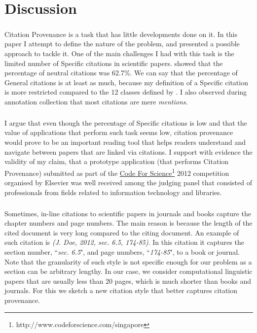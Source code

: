 \chapter{Discussion}
\label{discussion}
\paragraph{}
Citation Provenance is a task that has little developments done on it. In this paper I attempt to define the nature of the problem, and presented a possible approach to tackle it. One of the main challenges I had with this task is the limited number of Specific citations in scientific papers.  showed that the percentage of neutral citations was 62.7\%. We can say that the percentage of General citations is at least as much, because my definition of a Specific citation is more restricted compared to the 12 classes defined by . I also observed during annotation collection that most citations are mere {\it mentions}.

\paragraph{}
I argue that even though the percentage of Specific citations is low and that the value of applications that perform such task seems low, citation provenance would prove to be an important reading tool that helps readers understand and navigate between papers that are linked via citations. I support with evidence the validity of my claim, that a prototype application (that performs Citation Provenance) submitted as part of the \url{Code For Science}\footnote{http://www.codeforscience.com/singapore} 2012 competition organised by Elsevier was well received among the judging panel that consisted of professionals from fields related to information technology and libraries.

\paragraph{}
Sometimes, in-line citations to scientific papers in journals and books capture the chapter numbers and page numbers. The main reason is because the length of the cited document is very long compared to the citing document. An example of such citation is \textit{(J. Doe, 2012, sec. 6.5, 174-85)}. In this citation it captures the section number, ``\textit{sec. 6.5}", and page numbers, ``\textit{174-85}", to a book or journal. Note that the granularity of such style is not specific enough for our problem as a section can be arbitrary lengthy. In our case, we consider computational linguistic papers that are usually less than 20 pages, which is much shorter than books and journals. For this we sketch a new citation style that better captures citation provenance.

